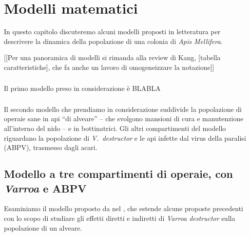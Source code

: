 \chapter[Modelli]{Modelli matematici}
In questo capitolo discuteremo alcuni modelli proposti in letteratura per descrivere la dinamica della popolazione di una colonia di \emph{Apis Mellifera}.

[[Per una panoramica di modelli si rimanda alla review di Kang, [tabella caratteristiche], che fa anche un lavoro di omogeneizzare la notazione]]

\paragraph{}
Il primo modello preso in considerazione è \parencite{khoury2011} BLABLA

\paragraph{}
Il secondo modello che prendiamo in considerazione \parencite{ratti2017} suddivide la popolazione di operaie sane in api ``di alveare'' -- che svolgono mansioni di cura e manutenzione all'interno del nido -- e in bottinatrici.
Gli altri compartimenti del modello riguardano la popolazione di \emph{V.~destructor} e le api infette dal virus della paralisi (ABPV), trasmesso dagli acari.



\section{Modello a tre compartimenti di operaie, con \emph{Varroa} e ABPV}
Esaminiamo il modello proposto da \citeauthor{ratti2017} nel \citeyear{ratti2017}, che estende alcune proposte precedenti con lo scopo di studiare gli effetti diretti e indiretti di \emph{Varroa destructor} sulla popolazione di un alveare.


